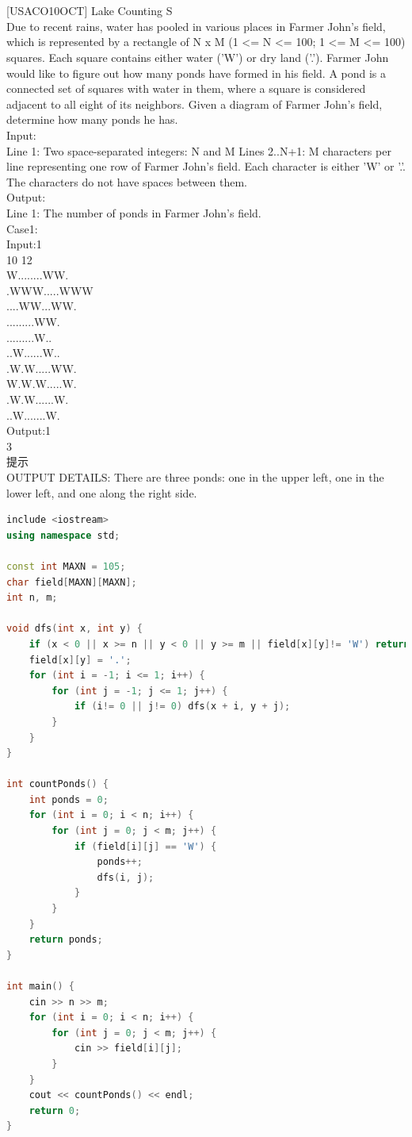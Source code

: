 \documentclass[12pt,twiside,a4paper]{ctexbook}
\numberwithin{chapter}{part}
\begin{document}
\section{}
[USACO10OCT] Lake Counting S\\
Due to recent rains, water has pooled in various places in Farmer John's field, which is represented by a rectangle of N x M (1 <= N <= 100; 1 <= M <= 100) squares. Each square contains either water ('W') or dry land ('.'). Farmer John would like to figure out how many ponds have formed in his field. A pond is a connected set of squares with water in them, where a square is considered adjacent to all eight of its neighbors. Given a diagram of Farmer John's field, determine how many ponds he has.\\
Input:\\
Line 1: Two space-separated integers: N and M \* Lines 2..N+1: M characters per line representing one row of Farmer John's field. Each character is either 'W' or '.'. The characters do not have spaces between them.\\
Output:\\
Line 1: The number of ponds in Farmer John's field.\\
Case1:\\
Input:1\\
10 12\\
W........WW.\\
.WWW.....WWW\\
....WW...WW.\\
.........WW.\\
.........W..\\
..W......W..\\
.W.W.....WW.\\
W.W.W.....W.\\
.W.W......W.\\
..W.......W.\\
Output:1\\
3\\
提示\\
OUTPUT DETAILS: There are three ponds: one in the upper left, one in the lower left, and one along the right side.
\begin{lstlisting}[language=c++,breaklines=true]
include <iostream>
using namespace std;

const int MAXN = 105;
char field[MAXN][MAXN];
int n, m;

void dfs(int x, int y) {
    if (x < 0 || x >= n || y < 0 || y >= m || field[x][y]!= 'W') return;
    field[x][y] = '.';
    for (int i = -1; i <= 1; i++) {
        for (int j = -1; j <= 1; j++) {
            if (i!= 0 || j!= 0) dfs(x + i, y + j);
        }
    }
}

int countPonds() {
    int ponds = 0;
    for (int i = 0; i < n; i++) {
        for (int j = 0; j < m; j++) {
            if (field[i][j] == 'W') {
                ponds++;
                dfs(i, j);
            }
        }
    }
    return ponds;
}

int main() {
    cin >> n >> m;
    for (int i = 0; i < n; i++) {
        for (int j = 0; j < m; j++) {
            cin >> field[i][j];
        }
    }
    cout << countPonds() << endl;
    return 0;
}
\end{lstlisting}
\end{document}
